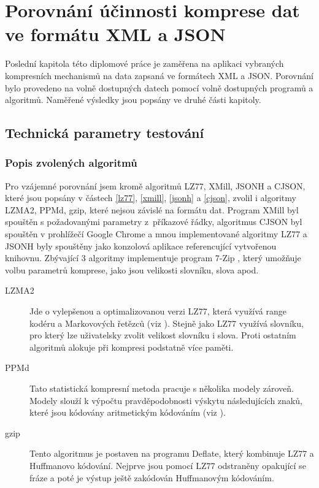 \chapter{Porovnání účinnosti komprese dat ve formátu XML a JSON}
\label{kapitolaPorovnaniUcinnosti}
Poslední kapitola této diplomové práce je zaměřena na aplikaci vybraných kompresních mechanismů na data zapsaná ve formátech XML a JSON. Porovnání bylo provedeno na volně dostupných datech pomocí volně dostupných programů a algoritmů. Naměřené výsledky jsou popsány ve druhé části kapitoly.

\section{Technická parametry testování}

\subsection{Popis zvolených algoritmů}
Pro vzájemné porovnání jsem kromě algoritmů LZ77, XMill, JSONH a CJSON, které jsou popsány v částech \ref{lz77}, \ref{xmill}, \ref{jsonh} a \ref{cjson}, zvolil i algoritmy LZMA2, PPMd, gzip, které nejsou závislé na formátu dat. Program XMill byl spouštěn s požadovanými parametry z~příkazové řádky, algoritmus CJSON byl spouštěn v prohlížečí Google Chrome a mnou implementované algoritmy LZ77 a JSONH byly spouštěny jako konzolová aplikace referencující vytvořenou knihovnu. Zbývající 3 algoritmy implementuje program 7-Zip \cite{7zip}, který umožňuje volbu parametrů komprese, jako jsou velikosti slovníku, slova apod.

\begin{description}
\item[LZMA2] Jde o vylepšenou a optimalizovanou verzi LZ77, která využívá range kodéru a Markovových řetězců (viz \cite{introductionToDataCompression}). Stejně jako LZ77 využívá slovníku, pro který lze uživatelsky zvolit velikost slovníku i slova. Proti ostatním algoritmů alokuje při kompresi podstatně více paměti.
\item[PPMd] Tato statistická kompresní metoda pracuje s několika modely zároveň. Modely slouží k výpočtu pravděpodobnosti výskytu následujících znaků, které jsou kódovány aritmetickým kódováním (viz \cite{introductionToDataCompression}).
\item[gzip] Tento algoritmus je postaven na programu Deflate, který kombinuje LZ77 a Huffmanovo kódování. Nejprve jsou pomocí LZ77 odstraněny opakující se fráze a poté je výstup ještě zakódován Huffmanovým kódováním. 
\end{description}

